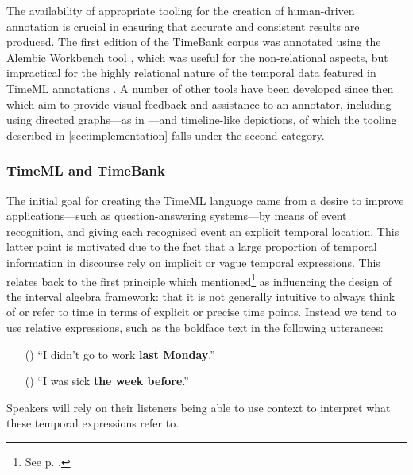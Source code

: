 \documentclass[a4paper,12pt,leqno]{article}
\newcommand{\ipp}{(\refstepcounter{equation}\theequation)}
\begin{document}
The availability of appropriate tooling for the creation of human-driven annotation is crucial in ensuring that accurate and consistent results are produced. The first edition of the TimeBank corpus was annotated using the Alembic Workbench tool \citep{day1997mixed}, which was useful for the non-relational aspects, but impractical for the highly relational nature of the temporal data featured in TimeML annotations \citep{verhagen2005TBOX}. A number of other tools have been developed since then which aim to provide visual feedback and assistance to an annotator, including using directed graphs---as in \citet{allen1983maintaining}---and timeline-like depictions, of which the tooling described in \cref{sec:implementation} falls under the second category.

\subsubsection{TimeML and TimeBank}\label{ssub:timeml}
The initial goal for creating the TimeML language came from a desire to improve applications\allowbreak{}---such as question-answering systems---by means of event recognition, and giving each recognised event an explicit temporal location. This latter point is motivated due to the fact that a large proportion of temporal information in discourse rely on implicit or vague temporal expressions. This relates back to the first principle which \citet{allen1983maintaining} mentioned\footnote{See p. \pageref{other:allen-motivations}.} as influencing the design of the interval algebra framework: that it is not generally intuitive to always think of or refer to time in terms of explicit or precise time points. Instead we tend to use relative expressions, such as the boldface text in the following utterances:
\begin{itemize}
	\item[\ipp] ``I didn't go to work \textbf{last Monday}.''
	\item[\ipp] ``I was sick \textbf{the week before}.''
\end{itemize}
Speakers will rely on their listeners being able to use context to interpret what these temporal expressions refer to.
\end{document}
